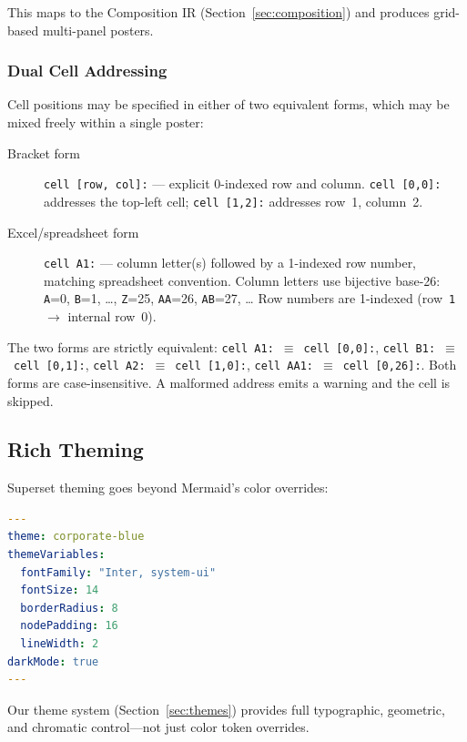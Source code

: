 This maps to the Composition IR (Section~\ref{sec:composition}) and produces grid-based
multi-panel posters.

\subsubsection*{Dual Cell Addressing}

Cell positions may be specified in either of two equivalent forms, which may be mixed
freely within a single poster:

\begin{description}
  \item[Bracket form] \texttt{cell [row, col]:} — explicit 0-indexed row and column.
        \texttt{cell [0,0]:} addresses the top-left cell; \texttt{cell [1,2]:} addresses
        row~1, column~2.

  \item[Excel/spreadsheet form] \texttt{cell A1:} — column letter(s) followed by a
        1-indexed row number, matching spreadsheet convention.
        Column letters use bijective base-26: \texttt{A}=0, \texttt{B}=1, \ldots,
        \texttt{Z}=25, \texttt{AA}=26, \texttt{AB}=27, \ldots
        Row numbers are 1-indexed (row~\texttt{1}~$\to$ internal row~0).
\end{description}

The two forms are strictly equivalent: \texttt{cell A1:}~$\equiv$~\texttt{cell [0,0]:},
\texttt{cell B1:}~$\equiv$~\texttt{cell [0,1]:},
\texttt{cell A2:}~$\equiv$~\texttt{cell [1,0]:},
\texttt{cell AA1:}~$\equiv$~\texttt{cell [0,26]:}.
Both forms are case-insensitive. A malformed address emits a warning and the cell is skipped.

\subsection{Rich Theming}

Superset theming goes beyond Mermaid's color overrides:

\begin{lstlisting}[language=yaml,caption={Rich theme configuration via frontmatter}]
---
theme: corporate-blue
themeVariables:
  fontFamily: "Inter, system-ui"
  fontSize: 14
  borderRadius: 8
  nodePadding: 16
  lineWidth: 2
darkMode: true
---
\end{lstlisting}

Our theme system (Section~\ref{sec:themes}) provides full typographic, geometric, and
chromatic control---not just color token overrides.

